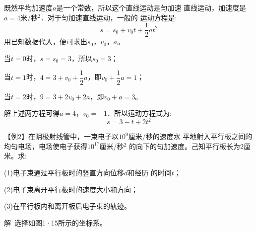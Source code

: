 \noindent 既然平均加速度$a$是一个常数，所以这个直线运动是匀加速
直线运动，加速度是$a=4$米/秒$^2$．对于匀加速直线运动，一般的
运动方程是:
\begin{equation*}
    s=s_0+v_{0}t+\frac{1}{2}at^2
\end{equation*}
用已知数据代入，便可求出$s_0$，$v_0$，$a$。

当$t=0$时，$s=s_0=3$，所以$s_0=3$；

当$t=1$时，$4=3+v_0+\dfrac 1 2 a$，即$v_0+\dfrac 1 2 a=1$；

当$t=2$时，$9=3+2v_0+2a$，即$v_0+a=3$。

解上述两方程可得$a=4$，$v_0=-1$．所以运动方程式为:
\begin{equation*}
    s=3-t+2t^2
\end{equation*}

\heiti 【例2】\normalfont 在阴极射线管中，一束电子以$10^9$厘米/秒的速度水
平地射入平行板之间的均匀电场，电场使电子获得$10^17$厘米/秒$^2$
的向下的匀加速度。己知平行板长为2厘米。求:

(1)电子束通过平行板时的竖直方向位移$d$和经历
的时间$t$；

(2)电子束离开平行板时的速度大小和方向；

(3)在平行板内和离开板后电子束的轨迹。

\heiti 解~\normalfont 选择如图1·15所示的坐标系。

